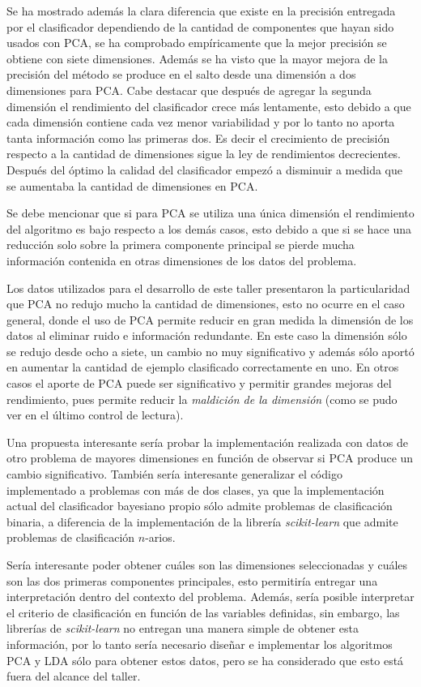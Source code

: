 \documentclass[letter, titlepage, 10pt]{article}
\begin{document}
Se ha mostrado además la clara diferencia que existe en la precisión entregada por el clasificador dependiendo de la cantidad de componentes que hayan sido usados con PCA, se ha comprobado empíricamente que la mejor precisión se obtiene con siete dimensiones. Además se ha visto que la mayor mejora de la precisión del método se produce en el salto desde una dimensión a dos dimensiones para PCA. Cabe destacar que después de agregar la segunda dimensión el rendimiento del clasificador crece más lentamente, esto debido a que cada dimensión contiene cada vez menor variabilidad y por lo tanto no aporta tanta información como las primeras dos. Es decir el crecimiento de precisión respecto a la cantidad de dimensiones sigue la ley de rendimientos decrecientes. Después del óptimo la calidad del clasificador empezó a disminuir a medida que se aumentaba la cantidad de dimensiones en PCA.

Se debe mencionar que si para PCA se utiliza una única dimensión el rendimiento del algoritmo es bajo respecto a los demás casos, esto debido a que si se hace una reducción solo sobre la primera componente principal se pierde mucha información contenida en otras dimensiones de los datos del problema. 

Los datos utilizados para el desarrollo de este taller presentaron la particularidad que PCA no redujo mucho la cantidad de dimensiones, esto no ocurre en el caso general, donde el uso de PCA permite reducir en gran medida la dimensión de los datos al eliminar ruido e información redundante. En este caso la dimensión sólo se redujo desde ocho a siete, un cambio no muy significativo y además sólo aportó en aumentar la cantidad de ejemplo clasificado correctamente en uno. En otros casos el aporte de PCA puede ser significativo y permitir grandes mejoras del rendimiento, pues permite reducir la \textit{maldición de la dimensión} (como se pudo ver en el último control de lectura).

Una propuesta interesante sería probar la implementación realizada con datos de otro problema de mayores dimensiones en función de observar si PCA produce un cambio significativo. También sería interesante generalizar el código implementado a problemas con más de dos clases, ya que la implementación actual del clasificador bayesiano propio sólo admite problemas de clasificación binaria, a diferencia de la implementación de la librería \textit{scikit-learn} que admite problemas de clasificación $n$-arios.

Sería interesante poder obtener cuáles son las dimensiones seleccionadas y cuáles son las dos primeras componentes principales, esto permitiría entregar una interpretación dentro del contexto del problema. Además, sería posible interpretar el criterio de clasificación en función de las variables definidas, sin embargo, las librerías de \textit{scikit-learn} no entregan una manera simple de obtener esta información, por lo tanto sería necesario diseñar e implementar los algoritmos PCA y LDA sólo para obtener estos datos, pero se ha considerado que esto está fuera del alcance del taller.
\end{document}
